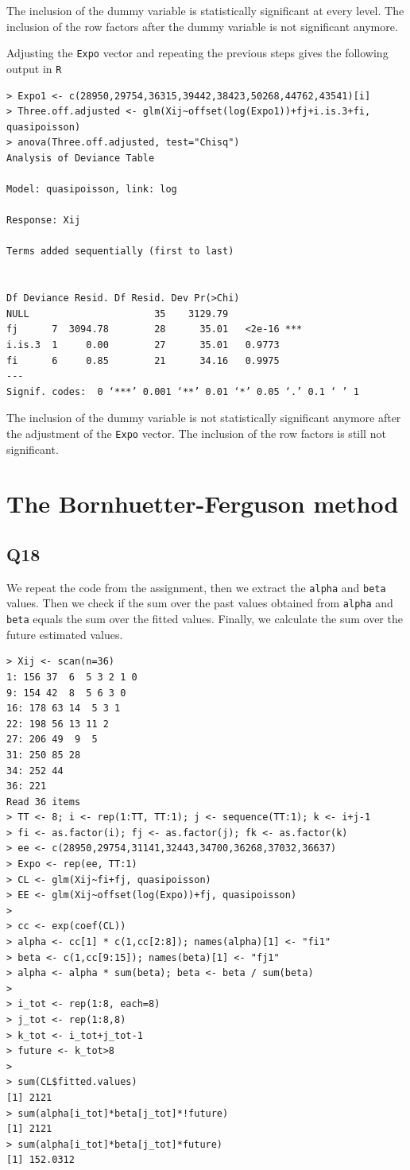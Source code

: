 \documentclass[11pt]{article}
\begin{document}
The inclusion of the dummy variable is statistically significant at every level. The inclusion of the row factors after the dummy variable is not significant anymore. 

Adjusting the \verb|Expo| vector and repeating the previous steps gives the following output in \verb|R|

\begin{verbatim}
> Expo1 <- c(28950,29754,36315,39442,38423,50268,44762,43541)[i]
> Three.off.adjusted <- glm(Xij~offset(log(Expo1))+fj+i.is.3+fi, quasipoisson)
> anova(Three.off.adjusted, test="Chisq")
Analysis of Deviance Table

Model: quasipoisson, link: log

Response: Xij

Terms added sequentially (first to last)


Df Deviance Resid. Df Resid. Dev Pr(>Chi)    
NULL                      35    3129.79             
fj      7  3094.78        28      35.01   <2e-16 ***
i.is.3  1     0.00        27      35.01   0.9773    
fi      6     0.85        21      34.16   0.9975    
---
Signif. codes:  0 ‘***’ 0.001 ‘**’ 0.01 ‘*’ 0.05 ‘.’ 0.1 ‘ ’ 1

\end{verbatim}
The inclusion of the dummy variable is not statistically significant anymore after the adjustment of the \verb|Expo| vector. The inclusion of the row factors is still not significant.

\section{The Bornhuetter-Ferguson method}

\subsection*{Q18}

We repeat the code from the assignment, then we extract the \verb|alpha| and \verb|beta| values. Then we check if the sum over the past values obtained from \verb|alpha| and \verb|beta| equals the sum over the fitted values. Finally, we calculate the sum over the future estimated values.

\begin{verbatim}
> Xij <- scan(n=36)
1: 156 37  6  5 3 2 1 0
9: 154 42  8  5 6 3 0
16: 178 63 14  5 3 1
22: 198 56 13 11 2
27: 206 49  9  5
31: 250 85 28
34: 252 44
36: 221
Read 36 items
> TT <- 8; i <- rep(1:TT, TT:1); j <- sequence(TT:1); k <- i+j-1
> fi <- as.factor(i); fj <- as.factor(j); fk <- as.factor(k)
> ee <- c(28950,29754,31141,32443,34700,36268,37032,36637)
> Expo <- rep(ee, TT:1)
> CL <- glm(Xij~fi+fj, quasipoisson)
> EE <- glm(Xij~offset(log(Expo))+fj, quasipoisson)
> 
> cc <- exp(coef(CL))
> alpha <- cc[1] * c(1,cc[2:8]); names(alpha)[1] <- "fi1"
> beta <- c(1,cc[9:15]); names(beta)[1] <- "fj1"
> alpha <- alpha * sum(beta); beta <- beta / sum(beta)
> 
> i_tot <- rep(1:8, each=8)
> j_tot <- rep(1:8,8)
> k_tot <- i_tot+j_tot-1
> future <- k_tot>8
> 
> sum(CL$fitted.values)
[1] 2121
> sum(alpha[i_tot]*beta[j_tot]*!future)
[1] 2121
> sum(alpha[i_tot]*beta[j_tot]*future)
[1] 152.0312
\end{verbatim}
\end{document}
